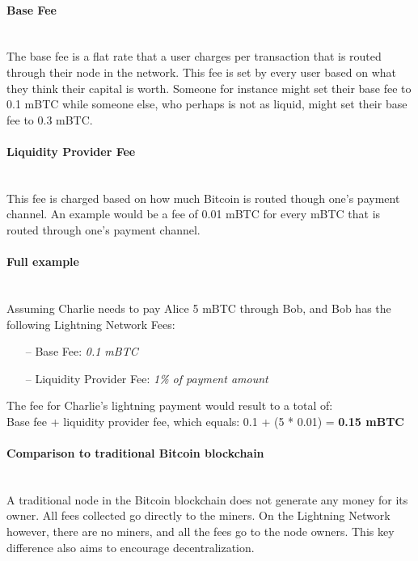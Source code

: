 \documentclass[a4paper, 12pt]{report}
\begin{document}
\paragraph{Base Fee} \hspace{0pt} \\
The base fee is a flat rate that a user charges per transaction that is routed through their node in the network. This fee is set by every user based on what they think their capital is worth. Someone for instance might set their base fee to 0.1 mBTC while someone else, who perhaps is not as liquid, might set their base fee to 0.3 mBTC.

\paragraph{Liquidity Provider Fee} \hspace{0pt} \\
This fee is charged based on how much Bitcoin is routed though one’s payment channel. An example would be a fee of 0.01 mBTC for every mBTC that is routed through one’s payment channel.

\paragraph{Full example} \hspace{0pt} \\
Assuming Charlie needs to pay Alice 5 mBTC through Bob, and Bob has the following Lightning Network Fees: 

\begin{itemize}
	\item[--] Base Fee: \tab \textit{0.1 mBTC} 
	\item[--] Liquidity Provider Fee: \tab \textit{1\% of payment amount} 
\end{itemize}

The fee for Charlie’s lightning payment would result to a total of:\\
Base fee + liquidity provider fee, which equals: 0.1 + (5 * 0.01) = \textbf{0.15 mBTC}

\paragraph{Comparison to traditional Bitcoin blockchain} \hspace{0pt} \\
A traditional node in the Bitcoin blockchain does not generate any money for its owner. All fees collected go directly to the miners. On the Lightning Network however, there are no miners, and all the fees go to the node owners. This key difference also aims to encourage decentralization.
\end{document}
